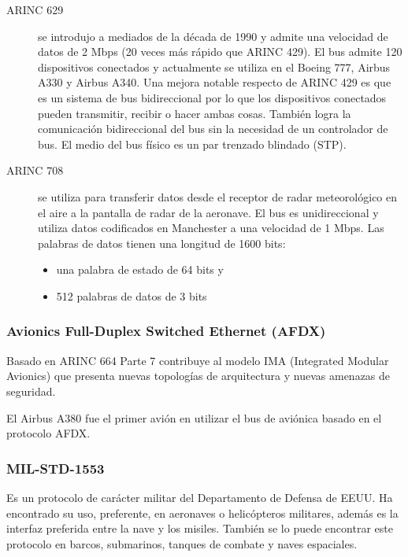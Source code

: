 \begin{description}
\item[ARINC 629] se introdujo a mediados de la década de 1990 y admite una velocidad de datos de 2 Mbps (20 veces más rápido que ARINC 429). El bus admite 120 dispositivos conectados y actualmente se utiliza en el Boeing 777, Airbus A330 y Airbus A340. Una mejora notable respecto de ARINC 429  es que  es un sistema de bus bidireccional por lo que los dispositivos conectados pueden transmitir, recibir o hacer ambas cosas. También  logra la comunicación bidireccional del bus sin la necesidad de un controlador de bus. El medio del bus físico es un par trenzado blindado (STP).

\item[ARINC 708] se utiliza para transferir datos desde el receptor de radar meteorológico en el aire a la pantalla de radar de la aeronave. El bus es unidireccional y utiliza datos codificados en Manchester a una velocidad de 1 Mbps. Las palabras de datos tienen una longitud de 1600 bits:
  \begin{itemize}
      \item una palabra de estado de 64 bits y
      \item 512 palabras de datos de 3 bits
  \end{itemize}

\end{description}

\subsubsection{Avionics Full-Duplex Switched Ethernet (AFDX)}
\label{sec:01.05.AFDX}

Basado en ARINC 664 Parte 7 contribuye al modelo IMA (Integrated Modular Avionics) que presenta nuevas topologías de arquitectura y nuevas amenazas de seguridad.
 
 El Airbus A380 fue el primer avión en utilizar el bus de aviónica basado en el protocolo AFDX. 




\subsubsection{MIL-STD-1553}
\label{sec:01.02.MIL.STD.1553}

Es un protocolo de carácter militar del Departamento de Defensa de  EEUU. 
Ha encontrado su uso, preferente, en aeronaves o helicópteros militares, además
es la interfaz preferida entre la nave y los misiles. 
También se lo puede encontrar este protocolo en barcos, submarinos, tanques de combate y naves espaciales.


